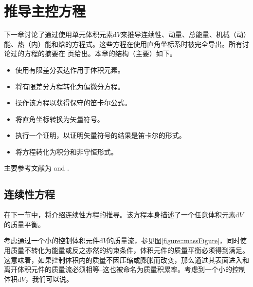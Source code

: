 \documentclass[LBMDerivation.tex]{subfiles}
\begin{document}
%
%
\chapter{推导主控方程}
%
%
%
      下一章讨论了通过使用单元体积元素d$V$来推导连续性、动量、总能量、机械（动）能、热（内）能和焓的方程式。这些方程在使用直角坐标系时被完全导出。所有讨论过的方程的摘要在 \pageref{SummationOfEquations}页给出。本章的结构（主要）如下。

%
%
\begin{itemize}
  \item 使用有限差分表达作用于体积元素。
  \item 将有限差分方程转化为偏微分方程。
  \item  操作该方程以获得保守的笛卡尔公式。
  \item 将直角坐标转换为矢量符号。
  \item 执行一个证明，以证明矢量符号的结果是笛卡尔的形式。
  \item 将方程转化为积分和非守恒形式。
\end{itemize}
%
%

	主要参考文献为
    \cite{  Bird, Versteeg, JasakPhD, Ferziger, Rappaz,  Schwarze, ProgrammersGuide}
    and \cite{Moukalled15}.
%
%
%
%
%
\section{连续性方程}
%
%
	在下一节中，将介绍连续性方程的推导。该方程本身描述了一个任意体积元素d$V$的质量平衡。

 考虑通过一个小的控制体积元件d$V$的质量流，参见图\ref{figure::massFigure}，同时使用质量不转化为能量或反之亦然的约束条件，体积元件的质量平衡必须得到满足。这意味着，如果控制体积内的质量不因压缩或膨胀而改变，那么通过其表面进入和离开体积元件的质量流必须相等--这也被命名为$\textit{质量积累率}$。考虑到一个小的控制体积d$V$，我们可以说。
\end{document}
